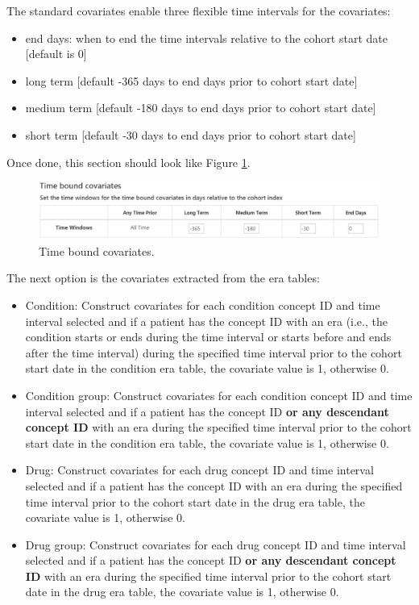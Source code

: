\documentclass[11pt]{book}
\providecommand{\tightlist}{%
  \setlength{\itemsep}{0pt}\setlength{\parskip}{0pt}}
\theoremstyle{definition}
\theoremstyle{definition}
\theoremstyle{definition}
\theoremstyle{remark}
\begin{document}
The standard covariates enable three flexible time intervals for the
covariates:

\begin{itemize}
\tightlist
\item
  end days: when to end the time intervals relative to the cohort start
  date {[}default is 0{]}
\item
  long term {[}default -365 days to end days prior to cohort start
  date{]}
\item
  medium term {[}default -180 days to end days prior to cohort start
  date{]}
\item
  short term {[}default -30 days to end days prior to cohort start
  date{]}
\end{itemize}

Once done, this section should look like Figure
\ref{fig:covariateSettings3}.

\begin{figure}

{\centering \includegraphics[width=1\linewidth]{images/PatientLevelPrediction/covariateSettings3} 

}

\caption{Time bound covariates.}\label{fig:covariateSettings3}
\end{figure}

The next option is the covariates extracted from the era tables:

\begin{itemize}
\tightlist
\item
  Condition: Construct covariates for each condition concept ID and time
  interval selected and if a patient has the concept ID with an era
  (i.e., the condition starts or ends during the time interval or starts
  before and ends after the time interval) during the specified time
  interval prior to the cohort start date in the condition era table,
  the covariate value is 1, otherwise 0.
\item
  Condition group: Construct covariates for each condition concept ID
  and time interval selected and if a patient has the concept ID
  \textbf{or any descendant concept ID} with an era during the specified
  time interval prior to the cohort start date in the condition era
  table, the covariate value is 1, otherwise 0.
\item
  Drug: Construct covariates for each drug concept ID and time interval
  selected and if a patient has the concept ID with an era during the
  specified time interval prior to the cohort start date in the drug era
  table, the covariate value is 1, otherwise 0.
\item
  Drug group: Construct covariates for each drug concept ID and time
  interval selected and if a patient has the concept ID \textbf{or any
  descendant concept ID} with an era during the specified time interval
  prior to the cohort start date in the drug era table, the covariate
  value is 1, otherwise 0.
\end{itemize}
\end{document}
